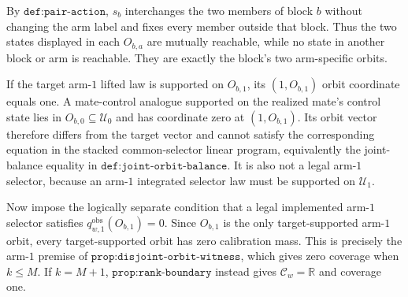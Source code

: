 By \(\texttt{def:pair-action}\), \(s_b\) interchanges the two members of block \(b\) without changing the arm label and fixes every member outside that block. Thus the two states displayed in each \(O_{b,a}\) are mutually reachable, while no state in another block or arm is reachable. They are exactly the block's two arm-specific orbits.

If the target arm-\(1\) lifted law is supported on \(O_{b,1}\), its \((1,O_{b,1})\) orbit coordinate equals one. A mate-control analogue supported on the realized mate's control state lies in \(O_{b,0}\subseteq\mathcal U_0\) and has coordinate zero at \((1,O_{b,1})\). Its orbit vector therefore differs from the target vector and cannot satisfy the corresponding equation in the stacked common-selector linear program, equivalently the joint-balance equality in \(\texttt{def:joint-orbit-balance}\). It is also not a legal arm-\(1\) selector, because an arm-\(1\) integrated selector law must be supported on \(\mathcal U_1\).

Now impose the logically separate condition that a legal implemented arm-\(1\) selector satisfies \(q^{\mathrm{obs}}_{w,1}(O_{b,1})=0\). Since \(O_{b,1}\) is the only target-supported arm-\(1\) orbit, every target-supported orbit has zero calibration mass. This is precisely the arm-\(1\) premise of \(\texttt{prop:disjoint-orbit-witness}\), which gives zero coverage when \(k\le M\). If \(k=M+1\), \(\texttt{prop:rank-boundary}\) instead gives \(\mathcal C_w=\mathbb R\) and coverage one.